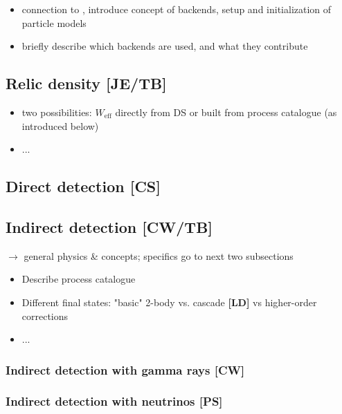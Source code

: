 \begin{itemize}
\item connection to \GB, introduce concept of backends, setup and initialization of particle models
\item briefly describe which backends are used, and what they contribute 
\end{itemize}

\subsection{Relic density {\bf [JE/TB]}}
\label{code_rd}
\begin{itemize}
\item two possibilities: $W_\mathrm{eff}$ directly from DS or built from process catalogue (as introduced below)
\item...
\end{itemize}

\subsection{Direct detection {\bf [CS]}}
\label{code_dd}


\subsection{Indirect detection {\bf [CW/TB]}}
\label{code_id}

$\to$ general physics \& concepts; specifics go to next two subsections
\begin{itemize}
\item Describe process catalogue 
\item Different final states: "basic" 2-body vs. cascade {\bf [LD]} vs higher-order corrections
\item...
\end{itemize}

\subsubsection{Indirect detection with gamma rays {\bf [CW]}}
\label{code_ga}

\subsubsection{Indirect detection with neutrinos {\bf [PS]}}
\label{code_nu}



